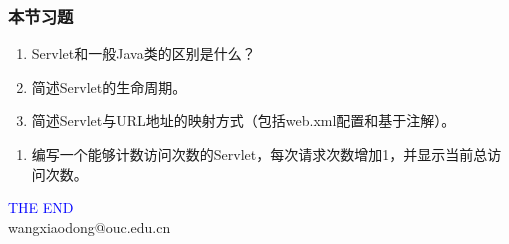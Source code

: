 \begin{frame}
  \frametitle{本节习题}

  
  \begin{enumerate}
  \item Servlet和一般Java类的区别是什么？
  \item 简述Servlet的生命周期。
  \item 简述Servlet与URL地址的映射方式（包括web.xml配置和基于注解）。
  \end{enumerate}

  
  \begin{enumerate}
  \item 编写一个能够计数访问次数的Servlet，每次请求次数增加1，并显示当前总访问次数。
  \end{enumerate}
\end{frame}
\begin{frame}
\centering
{\Huge \textcolor{blue}{THE END}} \\
\vspace{5mm}
{\Large wangxiaodong@ouc.edu.cn} \\
\end{frame}

